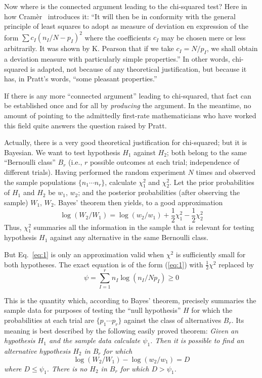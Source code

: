 \documentclass[12pt]{article}
\newcommand{\refeq}[1]{Eq.~\ref{#1}}
\newcommand{\refnum}[1]{(\ref{#1})}
\let\oldcite\cite
\renewcommand{\cite}{~\oldcite}
\begin{document}
Now where is the connected argument leading to the chi-squared
test? Here in how Cram\`{e}r\cite{cramer} introduces it: ``It will then be in
conformity with the general principle of least squares to adopt as
measure of deviation en expression of the form $\sum c_I (n_I/N -p_I)^2$ where
the coefficients $c_I$ may be chosen mere or less arbitrarily. It was
shown by K. Pearson that if we take $c_I = N /p_I$, we shall obtain a
deviation measure with particularly simple properties.'' In other words,
chi-squared is adapted, not because of any theoretical justification,
but because it has, in Pratt's words, ``some pleasant properties.''

If there is any more ``connected argument'' leading to chi-squared, that fact can be established once and for all by
\emph{producing} the argument. In the meantime, no amount of pointing to the admittedly first-rate mathematicians who have worked this field quite answers the question raised by Pratt.

Actually, there is a very good theoretical justification for
chi-squared; but it is Bayesian. We want to test hypothesis $H_1$ against $H_2$; both belong to the same ``Bernoulli class'' $B_r$ (i.e., $r$ possible outcomes at each trial; independence of different trials). Having
performed the random experiment $N$ times and observed the sample populations $\{n_1\cdots n_r\}$, calculate $\chi_1^2$ and $\chi_2^2$. Let the prior probabilities of $H_1$ and $H_2$ be $w_1$, $w_2$; and the posterior probabilities (after observing the sample) $W_1$, $W_2$. Bayes' theorem then yields, to a good approximation
\begin{equation}\label{eq:1}
\log(W_2/W_1) = \log(w_2/w_1) + \frac12 \chi_1^2 - \frac12 \chi_2^2
\end{equation}
Thus, $\chi_1^2$ summaries all the information in the sample that is relevant for testing hypothesis $H_1$ against any alternative in the same Bernoulli class.

But \refeq{eq:1} is only an approximation valid when $\chi^2$ is sufficiently small for both hypotheses. The exact equation is of the form \refnum{eq:1} with $\frac12\chi^2$ replaced by
\begin{equation}\label{eq:2}
\psi = \sum_{I=1}^r n_I \log(n_I/N p_I) \ge 0
\end{equation}

This is the quantity which, according to Bayes' theorem, precisely
summaries the sample data for purposes of testing the ``null hypothesis'' $H$ for which the probabilities at each trial are $\{p_1 \cdots p_r\}$ against the class of alternatives $B_r$.
Its meaning is  best described by the following easily proved theorem: \emph{Given an hypothesis $H_1$ and the sample data calculate $\psi_1$. Then it is possible to find an alternative hypothesis $H_2$ in $B_r$ for which
 \begin{equation}\label{eq:3}
\log(W_2/W_1) - \log(w_2/w_1) = D
\end{equation}
where $D\le \psi_1$. There is no $H_2$ in $B_r$ for which $D > \psi_1$.}
\end{document}
